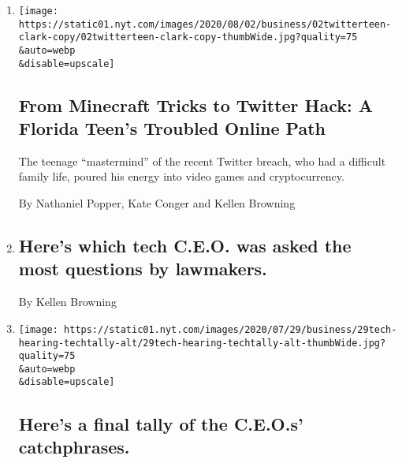 \begin{enumerate}
\def\labelenumi{\arabic{enumi}.}
\item
  \href{/2020/08/02/technology/florida-teenager-twitter-hack.html}{}

  \texttt{[image: https://static01.nyt.com/images/2020/08/02/business/02twitterteen-clark-copy/02twitterteen-clark-copy-thumbWide.jpg?quality=75\\\&auto=webp\\\&disable=upscale]}

  \hypertarget{from-minecraft-tricks-to-twitter-hack-a-florida-teens-troubled-online-path}{%
  \subsection{From Minecraft Tricks to Twitter Hack: A Florida Teen's
  Troubled Online
  Path}\label{from-minecraft-tricks-to-twitter-hack-a-florida-teens-troubled-online-path}}

  The teenage ``mastermind'' of the recent Twitter breach, who had a
  difficult family life, poured his energy into video games and
  cryptocurrency.

  By Nathaniel Popper, Kate Conger and Kellen Browning
\item
  \href{/live/2020/07/29/technology/tech-ceos-hearing-testimony/heres-which-tech-ceo-was-asked-the-most-questions-by-lawmakers}{}

  \hypertarget{heres-which-tech-ceo-was-asked-the-most-questions-by-lawmakers}{%
  \subsection{Here's which tech C.E.O. was asked the most questions by
  lawmakers.}\label{heres-which-tech-ceo-was-asked-the-most-questions-by-lawmakers}}

  By Kellen Browning
\item
  \href{/live/2020/07/29/technology/tech-ceos-hearing-testimony/what-ceos-said}{}

  \texttt{[image: https://static01.nyt.com/images/2020/07/29/business/29tech-hearing-techtally-alt/29tech-hearing-techtally-alt-thumbWide.jpg?quality=75\\\&auto=webp\\\&disable=upscale]}

  \hypertarget{heres-a-final-tally-of-the-ceos-catchphrases}{%
  \subsection{Here's a final tally of the C.E.O.s'
  catchphrases.}\label{heres-a-final-tally-of-the-ceos-catchphrases}}


\end{enumerate}

